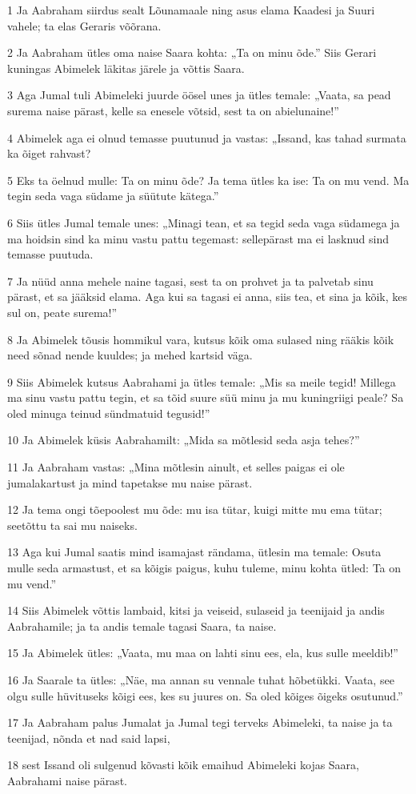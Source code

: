 \par 1 Ja Aabraham siirdus sealt Lõunamaale ning asus elama Kaadesi ja Suuri vahele; ta elas Geraris võõrana.
\par 2 Ja Aabraham ütles oma naise Saara kohta: „Ta on minu õde.” Siis Gerari kuningas Abimelek läkitas järele ja võttis Saara.
\par 3 Aga Jumal tuli Abimeleki juurde öösel unes ja ütles temale: „Vaata, sa pead surema naise pärast, kelle sa enesele võtsid, sest ta on abielunaine!”
\par 4 Abimelek aga ei olnud temasse puutunud ja vastas: „Issand, kas tahad surmata ka õiget rahvast?
\par 5 Eks ta öelnud mulle: Ta on minu õde? Ja tema ütles ka ise: Ta on mu vend. Ma tegin seda vaga südame ja süütute kätega.”
\par 6 Siis ütles Jumal temale unes: „Minagi tean, et sa tegid seda vaga südamega ja ma hoidsin sind ka minu vastu pattu tegemast: sellepärast ma ei lasknud sind temasse puutuda.
\par 7 Ja nüüd anna mehele naine tagasi, sest ta on prohvet ja ta palvetab sinu pärast, et sa jääksid elama. Aga kui sa tagasi ei anna, siis tea, et sina ja kõik, kes sul on, peate surema!”
\par 8 Ja Abimelek tõusis hommikul vara, kutsus kõik oma sulased ning rääkis kõik need sõnad nende kuuldes; ja mehed kartsid väga.
\par 9 Siis Abimelek kutsus Aabrahami ja ütles temale: „Mis sa meile tegid! Millega ma sinu vastu pattu tegin, et sa tõid suure süü minu ja mu kuningriigi peale? Sa oled minuga teinud sündmatuid tegusid!”
\par 10 Ja Abimelek küsis Aabrahamilt: „Mida sa mõtlesid seda asja tehes?”
\par 11 Ja Aabraham vastas: „Mina mõtlesin ainult, et selles paigas ei ole jumalakartust ja mind tapetakse mu naise pärast.
\par 12 Ja tema ongi tõepoolest mu õde: mu isa tütar, kuigi mitte mu ema tütar; seetõttu ta sai mu naiseks.
\par 13 Aga kui Jumal saatis mind isamajast rändama, ütlesin ma temale: Osuta mulle seda armastust, et sa kõigis paigus, kuhu tuleme, minu kohta ütled: Ta on mu vend.”
\par 14 Siis Abimelek võttis lambaid, kitsi ja veiseid, sulaseid ja teenijaid ja andis Aabrahamile; ja ta andis temale tagasi Saara, ta naise.
\par 15 Ja Abimelek ütles: „Vaata, mu maa on lahti sinu ees, ela, kus sulle meeldib!”
\par 16 Ja Saarale ta ütles: „Näe, ma annan su vennale tuhat hõbetükki. Vaata, see olgu sulle hüvituseks kõigi ees, kes su juures on. Sa oled kõiges õigeks osutunud.”
\par 17 Ja Aabraham palus Jumalat ja Jumal tegi terveks Abimeleki, ta naise ja ta teenijad, nõnda et nad said lapsi,
\par 18 sest Issand oli sulgenud kõvasti kõik emaihud Abimeleki kojas Saara, Aabrahami naise pärast.

